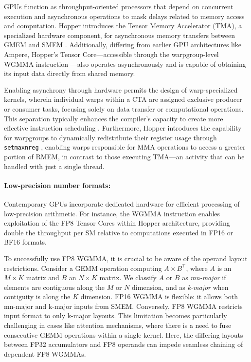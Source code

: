 \begin{enumerate}
GPUs function as throughput-oriented processors that depend on concurrent execution and asynchronous operations to mask delays related to memory access and computation. Hopper introduces the Tensor Memory Accelerator (TMA), a specialized hardware component, for asynchronous memory transfers between GMEM and SMEM \cite[\S7.29]{cuda}. Additionally, differing from earlier GPU architectures like Ampere, Hopper’s Tensor Core—accessible through the warpgroup-level WGMMA instruction \cite[\S9.7.14]{ptx}—also operates asynchronously and is capable of obtaining its input data directly from shared memory.

Enabling asynchrony through hardware permits the design of warp-specialized kernels, wherein individual warps within a CTA are assigned exclusive producer or consumer tasks, focusing solely on data transfer or computational operations. This separation typically enhances the compiler's capacity to create more effective instruction scheduling \citep{warp-specialization-2011}. Furthermore, Hopper introduces the capability for warpgroups to dynamically redistribute their register usage through \verb|setmaxnreg| \cite[\S9.7.17.1]{ptx}, enabling warps responsible for MMA operations to access a greater portion of RMEM, in contrast to those executing TMA—an activity that can be handled with just a single thread.

\paragraph{Low-precision number formats:}
\label{sec:low-precision-gpu}
Contemporary GPUs incorporate dedicated hardware for efficient processing of low-precision arithmetic. For instance, the WGMMA instruction enables exploitation of the FP8 Tensor Cores within Hopper architecture, providing double the throughput per SM relative to computations executed in FP16 or BF16 formats.

To successfully use FP8 WGMMA, it is crucial to be aware of the operand layout restrictions. Consider a GEMM operation computing $A \times B^{\top}$, where $A$ is an $M\times K$ matrix and $B$ an $N\times K$ matrix. We classify $A$ or $B$ as \emph{mn-major} if elements are contiguous along the $M$ or $N$ dimension, and as \emph{k-major} when contiguity is along the $K$ dimension. FP16 WGMMA is flexible: it allows both mn-major and k-major inputs from SMEM. Conversely, FP8 WGMMA restricts input format to only k-major layouts. This limitation becomes particularly challenging in cases like attention mechanisms, where there is a need to fuse consecutive GEMM operations within a single kernel. Here, the differing layouts between FP32 accumulators and FP8 operands can impede seamless chaining of dependent FP8 WGMMAs.


\end{enumerate}

